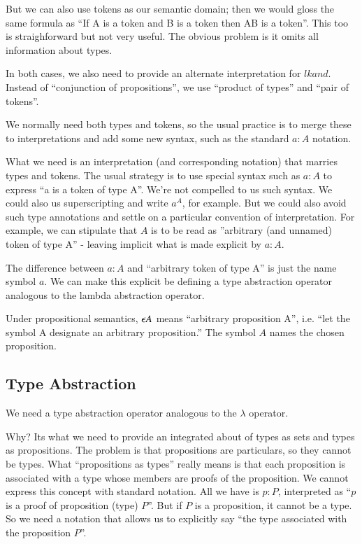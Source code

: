 \documentclass{article}
\begin{document}
But we can also use tokens as our semantic domain; then we would gloss
the same formula as ``If A is a token and B is a token then A\lkand B
is a token''. This too is straighforward but not very useful. The
obvious problem is it omits all information about types.

In both cases, we also need to provide an alternate interpretation for
\(lkand\). Instead of ``conjunction of propositions'', we use
``product of types'' and ``pair of tokens''.

We normally need both types and tokens, so the usual practice is to
merge these to interpretations and add some new syntax, such as the
standard \(a:A\) notation.

What we need is an interpretation (and corresponding notation) that
marries types and tokens. The usual strategy is to use special syntax
such as \(a:A\) to express ``a is a token of type A''. We're not
compelled to us such syntax. We could also us superscripting and write
\(a^A\), for example. But we could also avoid such type annotations
and settle on a particular convention of interpretation. For example,
we can stipulate that \(A\) is to be read as ''arbitrary (and unnamed)
token of type A'' - leaving implicit what is made explicit by \(a:A\).

The difference between \(a:A\) and ``arbitrary token of type A'' is
just the name symbol \(a\). We can make this explicit be defining a
type abstraction operator analogous to the lambda abstraction
operator.

Under propositional semantics, \(\epsilon A\) means ``arbitrary
proposition A'', i.e. ``let the symbol A designate an arbitrary
proposition.''  The symbol \(A\) names the chosen proposition.

\subsection{Type Abstraction}

We need a type abstraction operator analogous to the \(\lambda\)
operator.

Why? Its what we need to provide an integrated about of types as sets
and types as propositions. The problem is that propositions are
particulars, so they cannot be types. What ``propositions as types''
really means is that each proposition is associated with a type whose
members are proofs of the proposition. We cannot express this concept
with standard notation. All we have is \(p:P\), interpreted as ``\(p\)
is a proof of proposition (type) \(P\)''. But if \(P\) is a
proposition, it cannot be a type. So we need a notation that allows us
to explicitly say ``the type associated with the proposition \(P\)''.
\end{document}
